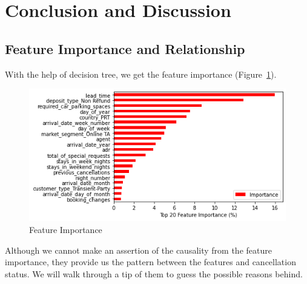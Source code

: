 \documentclass[10pt,twocolumn,letterpaper]{article}
\begin{document}
\section{Conclusion and Discussion}


\subsection{Feature Importance and Relationship}

With the help of decision tree, we get the feature importance (Figure~\ref{fig:FeatureImp}).

\begin{figure}[H]
\begin{center}
    \includegraphics[width=0.8\linewidth]{images/Feature_Importance.png}
\end{center}
    \caption{Feature Importance}
\label{fig:FeatureImp}
\end{figure}

Although we cannot make an assertion of the causality from the feature importance, they provide us the pattern between the features and cancellation status. We will walk through a tip of them to guess the possible reasons behind. %
\end{document}
